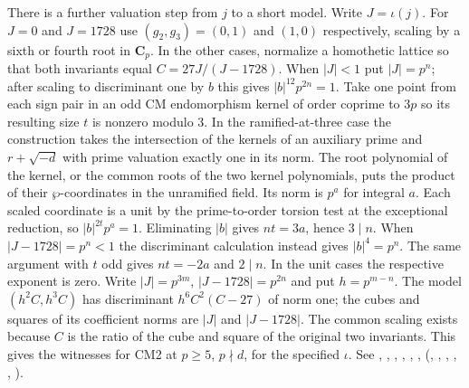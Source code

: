 There is a further valuation step from $j$ to a short model.
Write $J=\iota(j)$. For $J=0$ and $J=1728$ use $(g_2,g_3)=(0,1)$
and $(1,0)$ respectively, scaling by a sixth or fourth root in
$\mathbf C_p$. In the other cases, normalize a homothetic lattice
so that both invariants equal $C=27J/(J-1728)$. When $|J|<1$ put
$|J|=p^n$; after scaling to discriminant one by $b$ this gives
$|b|^{12}p^{2n}=1$. Take one point from each sign pair in an odd CM
endomorphism kernel of order coprime to $3p$ so its resulting size
$t$ is nonzero modulo 3. In the ramified-at-three case the construction
takes the intersection of the kernels of an auxiliary prime and
$r+\sqrt{-d}$ with prime valuation exactly one in its norm.
The root polynomial of the kernel, or the common roots of the two
kernel polynomials, puts the product of their $\wp$-coordinates in
the unramified field. Its norm is $p^a$ for integral $a$. Each scaled
coordinate is a unit by the prime-to-order torsion test at the
exceptional reduction, so $|b|^{2t}p^a=1$. Eliminating $|b|$ gives
$nt=3a$, hence $3\mid n$. When $|J-1728|=p^n<1$ the discriminant
calculation instead gives $|b|^4=p^n$. The same argument with $t$
odd gives $nt=-2a$ and $2\mid n$. In the unit cases the respective
exponent is zero. Write $|J|=p^{3m}$, $|J-1728|=p^{2n}$ and put
$h=p^{m-n}$. The model $(h^2 C,h^3 C)$ has discriminant
$h^6 C^2(C-27)$ of norm one; the cubes and squares of its
coefficient norms are $|J|$ and $|J-1728|$. The common scaling exists
because $C$ is the ratio of the cube and square of the original two
invariants. This gives the witnesses for CM2 at $p\ge5$, $p\nmid d$,
for the specified $\iota$. See , ,
, , , ,
 (, ,
, ,
, ).


